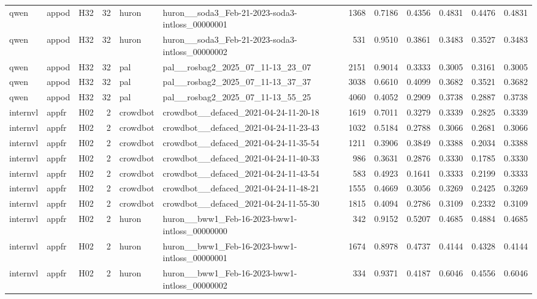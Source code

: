 \begin{table}[tbp]
\begin{tabular}{lllrllrrrrrr}
qwen & appod & H32 & 32 & huron & huron\_\_soda3\_Feb-21-2023-soda3-intloss\_00000001 & 1368 & 0.7186 & 0.4356 & 0.4831 & 0.4476 & 0.4831 \\
qwen & appod & H32 & 32 & huron & huron\_\_soda3\_Feb-21-2023-soda3-intloss\_00000002 & 531 & 0.9510 & 0.3861 & 0.3483 & 0.3527 & 0.3483 \\
qwen & appod & H32 & 32 & pal & pal\_\_rosbag2\_2025\_07\_11-13\_23\_07 & 2151 & 0.9014 & 0.3333 & 0.3005 & 0.3161 & 0.3005 \\
qwen & appod & H32 & 32 & pal & pal\_\_rosbag2\_2025\_07\_11-13\_37\_37 & 3038 & 0.6610 & 0.4099 & 0.3682 & 0.3521 & 0.3682 \\
qwen & appod & H32 & 32 & pal & pal\_\_rosbag2\_2025\_07\_11-13\_55\_25 & 4060 & 0.4052 & 0.2909 & 0.3738 & 0.2887 & 0.3738 \\
internvl & appfr & H02 & 2 & crowdbot & crowdbot\_\_defaced\_2021-04-24-11-20-18 & 1619 & 0.7011 & 0.3279 & 0.3339 & 0.2825 & 0.3339 \\
internvl & appfr & H02 & 2 & crowdbot & crowdbot\_\_defaced\_2021-04-24-11-23-43 & 1032 & 0.5184 & 0.2788 & 0.3066 & 0.2681 & 0.3066 \\
internvl & appfr & H02 & 2 & crowdbot & crowdbot\_\_defaced\_2021-04-24-11-35-54 & 1211 & 0.3906 & 0.3849 & 0.3388 & 0.2034 & 0.3388 \\
internvl & appfr & H02 & 2 & crowdbot & crowdbot\_\_defaced\_2021-04-24-11-40-33 & 986 & 0.3631 & 0.2876 & 0.3330 & 0.1785 & 0.3330 \\
internvl & appfr & H02 & 2 & crowdbot & crowdbot\_\_defaced\_2021-04-24-11-43-54 & 583 & 0.4923 & 0.1641 & 0.3333 & 0.2199 & 0.3333 \\
internvl & appfr & H02 & 2 & crowdbot & crowdbot\_\_defaced\_2021-04-24-11-48-21 & 1555 & 0.4669 & 0.3056 & 0.3269 & 0.2425 & 0.3269 \\
internvl & appfr & H02 & 2 & crowdbot & crowdbot\_\_defaced\_2021-04-24-11-55-30 & 1815 & 0.4094 & 0.2786 & 0.3109 & 0.2332 & 0.3109 \\
internvl & appfr & H02 & 2 & huron & huron\_\_bww1\_Feb-16-2023-bww1-intloss\_00000000 & 342 & 0.9152 & 0.5207 & 0.4685 & 0.4884 & 0.4685 \\
internvl & appfr & H02 & 2 & huron & huron\_\_bww1\_Feb-16-2023-bww1-intloss\_00000001 & 1674 & 0.8978 & 0.4737 & 0.4144 & 0.4328 & 0.4144 \\
internvl & appfr & H02 & 2 & huron & huron\_\_bww1\_Feb-16-2023-bww1-intloss\_00000002 & 334 & 0.9371 & 0.4187 & 0.6046 & 0.4556 & 0.6046 \\

\end{tabular}
\end{table}
